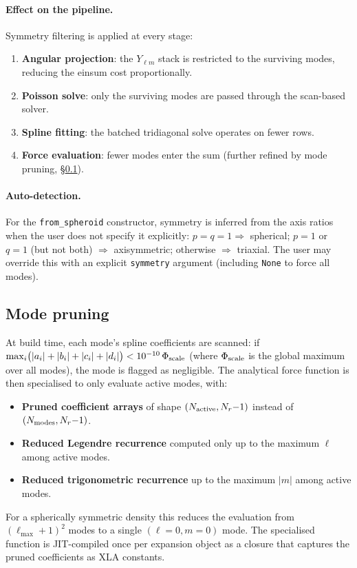 \documentclass[11pt]{article}
\begin{document}
\paragraph{Effect on the pipeline.}
Symmetry filtering is applied at every stage:
\begin{enumerate}
  \item \textbf{Angular projection}: the $Y_{\ell m}$ stack is restricted to
        the surviving modes, reducing the einsum cost proportionally.
  \item \textbf{Poisson solve}: only the surviving modes are passed through
        the scan-based solver.
  \item \textbf{Spline fitting}: the batched tridiagonal solve operates on
        fewer rows.
  \item \textbf{Force evaluation}: fewer modes enter the sum (further refined
        by mode pruning, \S\ref{sec:pruning}).
\end{enumerate}

\paragraph{Auto-detection.}
For the \texttt{from\_spheroid} constructor, symmetry is inferred from the
axis ratios when the user does not specify it explicitly:
$p = q = 1 \Rightarrow$ spherical;
$p = 1$ or $q = 1$ (but not both) $\Rightarrow$ axisymmetric;
otherwise $\Rightarrow$ triaxial.
The user may override this with an explicit \texttt{symmetry} argument
(including \texttt{None} to force all modes).

\subsection{Mode pruning}
\label{sec:pruning}

At build time, each mode's spline coefficients are scanned: if
$\max_i\bigl(|a_i|+|b_i|+|c_i|+|d_i|\bigr) < 10^{-10}\,\Phi_{\rm scale}$
(where $\Phi_{\rm scale}$ is the global maximum over all modes), the mode is
flagged as negligible.  The analytical force function is then specialised to
only evaluate active modes, with:
\begin{itemize}
  \item \textbf{Pruned coefficient arrays} of shape
        $(N_{\rm active}, N_r{-}1)$ instead of $(N_{\rm modes}, N_r{-}1)$.
  \item \textbf{Reduced Legendre recurrence} computed only up to the
        maximum $\ell$ among active modes.
  \item \textbf{Reduced trigonometric recurrence} up to the maximum $|m|$
        among active modes.
\end{itemize}
For a spherically symmetric density this reduces the evaluation from
$(\ell_{\max}+1)^2$ modes to a single $(\ell{=}0, m{=}0)$ mode.
The specialised function is JIT-compiled once per expansion object as a
closure that captures the pruned coefficients as XLA constants.
\end{document}
